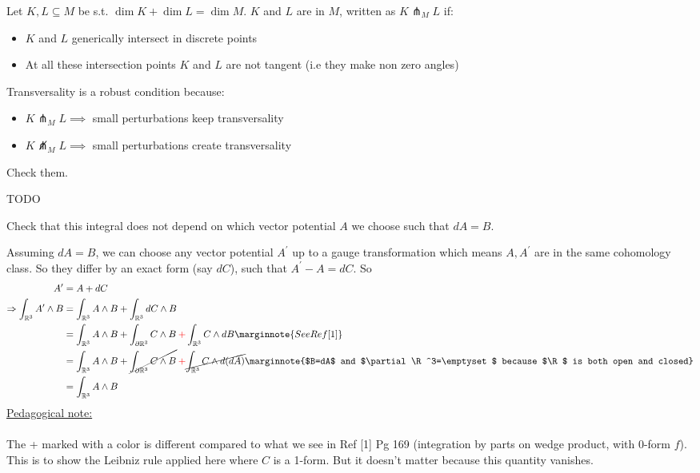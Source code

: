 \documentclass[10pt]{article}
\begin{document}
\begin{definition}
	Let $K, L \subseteq M$ be s.t. $\dim K + \dim L = \dim M$. $K$ and $L$ are  in $M$, written as $K \pitchfork_M L$ if:
	\begin{itemize}
		\item $K$ and $L$ generically intersect in discrete points
		\item At all these intersection points $K$ and $L$ are not tangent (i.e they make non zero angles)
	\end{itemize}
	Transversality is a robust condition because:
	\begin{itemize}
		\item $K \pitchfork_M L \implies$ small perturbations keep transversality
		\item $K \not\pitchfork_M L \implies$ small perturbations create transversality
	\end{itemize}
\end{definition}


\begin{example}
	Check them.
\end{example}
\sol TODO


\begin{example}
	Check that this integral does not depend on which vector potential $A$ we choose such that $dA=B$.
\end{example}
\sol Assuming $dA=B$, we can choose any vector potential $A^\prime$ up to a gauge transformation which means $A,A^\prime$ are in the same cohomology class. So they differ by an exact form (say $dC$), such that $A^\prime-A=dC$. So
$$
\begin{aligned}
	A^\prime&=A+dC\\
	\Rightarrow \int_{\R^3}A^\prime\wedge B &= \int_{\R^3}A\wedge B + \int_{\R^3}dC\wedge B\\
	&=\int_{\R^3}A\wedge B + \int_{\partial\R^3}C\wedge B{\:\color{red}+}\int_{\R^3}C\wedge dB\marginnote{See Ref [1]}\\
	&=\int_{\R^3}A\wedge B + \cancel{\int_{\partial\R^3}C\wedge B}{\:\color{red}+}\cancel{\int_{\R^3}C\wedge d(dA)}\marginnote{$B=dA$ and $\partial\R^3=\emptyset$ because $\R$ is both open and closed}\\
	&= \int_{\R^3}A\wedge B
\end{aligned}
$$
\underline{Pedagogical note:}\\\\
The {\color{red}+} marked with a color is different compared to what we see in Ref [1] Pg 169 (integration by parts on wedge product, with 0-form $f$). This is to show the Leibniz rule applied here where $C$ is a 1-form. But it doesn't matter because this quantity vanishes.
\end{document}
